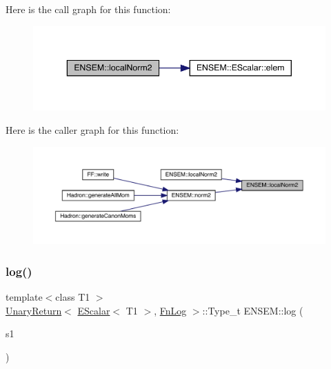 Here is the call graph for this function\+:
\nopagebreak
\begin{figure}[H]
\begin{center}
\leavevmode
\includegraphics[width=343pt]{d4/dca/group__escalar_ga5612cd39905e848db7ef691d10437811_cgraph}
\end{center}
\end{figure}
Here is the caller graph for this function\+:
\nopagebreak
\begin{figure}[H]
\begin{center}
\leavevmode
\includegraphics[width=350pt]{d4/dca/group__escalar_ga5612cd39905e848db7ef691d10437811_icgraph}
\end{center}
\end{figure}
\mbox{\label{group__escalar_gabe969a92b7a6a506a417bb17fdf68b4c}} 
\subsubsection{\texorpdfstring{log()}{log()}}
{\footnotesize\ttfamily template$<$class T1 $>$ \\
\mbox{\hyperlink{structENSEM_1_1UnaryReturn}{Unary\+Return}}$<$ \mbox{\hyperlink{classENSEM_1_1EScalar}{E\+Scalar}}$<$ T1 $>$, \mbox{\hyperlink{structENSEM_1_1FnLog}{Fn\+Log}} $>$\+::Type\+\_\+t E\+N\+S\+E\+M\+::log (\begin{DoxyParamCaption}\item[{const \mbox{\hyperlink{classENSEM_1_1EScalar}{E\+Scalar}}$<$ T1 $>$ \&}]{s1 }\end{DoxyParamCaption})\hspace{0.3cm}{\ttfamily [inline]}}

